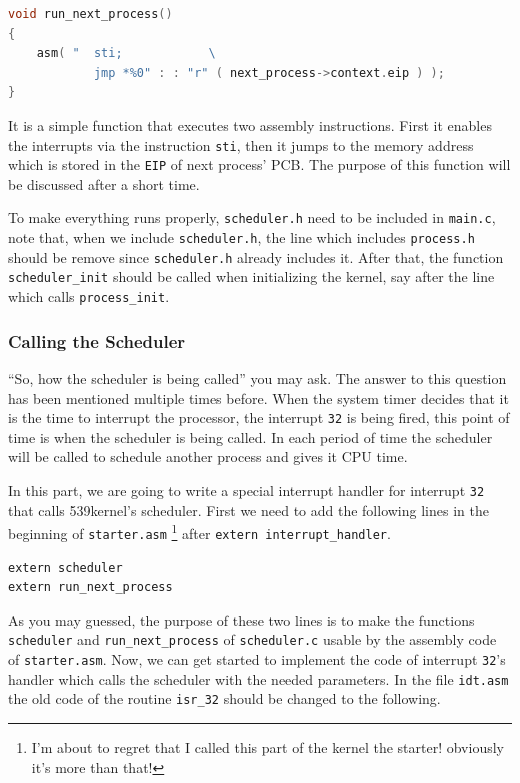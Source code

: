 \begin{lstlisting}[language=C]
void run_next_process()
{
    asm( "  sti;            \
            jmp *%0" : : "r" ( next_process->context.eip ) );
}
\end{lstlisting}

It is a simple function that executes two assembly instructions. First
it enables the interrupts via the instruction \lstinline!sti!, then it
jumps to the memory address which is stored in the \lstinline!EIP! of
next process' PCB. The purpose of this function will be discussed after
a short time.

To make everything runs properly, \lstinline!scheduler.h! need to be
included in \lstinline!main.c!, note that, when we include
\lstinline!scheduler.h!, the line which includes \lstinline!process.h!
should be remove since \lstinline!scheduler.h! already includes it.
After that, the function \lstinline!scheduler_init! should be called
when initializing the kernel, say after the line which calls
\lstinline!process_init!.

\subsubsection{Calling the Scheduler}\label{calling-the-scheduler}

``So, how the scheduler is being called'' you may ask. The answer to
this question has been mentioned multiple times before. When the system
timer decides that it is the time to interrupt the processor, the
interrupt \lstinline!32! is being fired, this point of time is when the
scheduler is being called. In each period of time the scheduler will be
called to schedule another process and gives it CPU time.

In this part, we are going to write a special interrupt handler for
interrupt \lstinline!32! that calls 539kernel's scheduler. First we need
to add the following lines in the beginning of \lstinline!starter.asm!
\footnote{I'm about to regret that I called this part of the kernel the
  starter! obviously it's more than that!} after
\lstinline!extern interrupt_handler!.

\begin{lstlisting}
extern scheduler
extern run_next_process
\end{lstlisting}

As you may guessed, the purpose of these two lines is to make the
functions \lstinline!scheduler! and \lstinline!run_next_process! of
\lstinline!scheduler.c! usable by the assembly code of
\lstinline!starter.asm!. Now, we can get started to implement the code
of interrupt \lstinline!32!'s handler which calls the scheduler with the
needed parameters. In the file \lstinline!idt.asm! the old code of the
routine \lstinline!isr_32! should be changed to the following.

